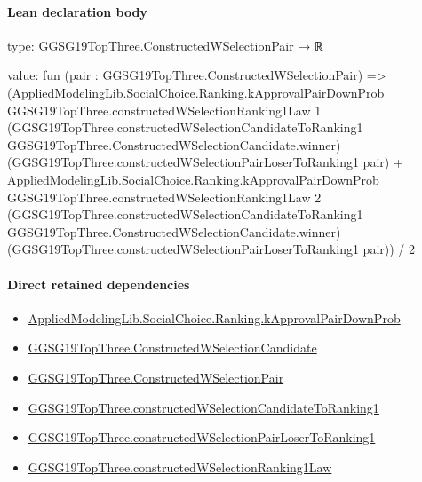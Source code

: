 \documentclass[10pt]{article}
\begin{document}
\paragraph{Lean declaration body}
\begin{ReviewVerbatim}
type:
GGSG19TopThree.ConstructedWSelectionPair → ℝ

value:
fun (pair : GGSG19TopThree.ConstructedWSelectionPair) =>
  (AppliedModelingLib.SocialChoice.Ranking.kApprovalPairDownProb GGSG19TopThree.constructedWSelectionRanking1Law 1
        (GGSG19TopThree.constructedWSelectionCandidateToRanking1 GGSG19TopThree.ConstructedWSelectionCandidate.winner)
        (GGSG19TopThree.constructedWSelectionPairLoserToRanking1 pair) +
      AppliedModelingLib.SocialChoice.Ranking.kApprovalPairDownProb GGSG19TopThree.constructedWSelectionRanking1Law 2
        (GGSG19TopThree.constructedWSelectionCandidateToRanking1 GGSG19TopThree.ConstructedWSelectionCandidate.winner)
        (GGSG19TopThree.constructedWSelectionPairLoserToRanking1 pair)) /
    2
\end{ReviewVerbatim}

\paragraph{Direct retained dependencies}
\begin{itemize}\raggedright
\item \hyperlink{governing-declaration-f0edd92cba673ac3}{Applied\allowbreak{}Modeling\allowbreak{}Lib.\allowbreak{}Social\allowbreak{}Choice.\allowbreak{}Ranking.\allowbreak{}k\allowbreak{}Approval\allowbreak{}Pair\allowbreak{}Down\allowbreak{}Prob}
\item \hyperlink{governing-declaration-3d8d24c3324b5679}{GGSG19\allowbreak{}Top\allowbreak{}Three.\allowbreak{}Constructed\allowbreak{}W\allowbreak{}Selection\allowbreak{}Candidate}
\item \hyperlink{governing-declaration-e199ab04eef2bd8a}{GGSG19\allowbreak{}Top\allowbreak{}Three.\allowbreak{}Constructed\allowbreak{}W\allowbreak{}Selection\allowbreak{}Pair}
\item \hyperlink{governing-declaration-9fcc66be47e20c93}{GGSG19\allowbreak{}Top\allowbreak{}Three.\allowbreak{}constructed\allowbreak{}W\allowbreak{}Selection\allowbreak{}Candidate\allowbreak{}To\allowbreak{}Ranking1}
\item \hyperlink{governing-declaration-016411617e1a74fc}{GGSG19\allowbreak{}Top\allowbreak{}Three.\allowbreak{}constructed\allowbreak{}W\allowbreak{}Selection\allowbreak{}Pair\allowbreak{}Loser\allowbreak{}To\allowbreak{}Ranking1}
\item \hyperlink{governing-declaration-14324bc497c42774}{GGSG19\allowbreak{}Top\allowbreak{}Three.\allowbreak{}constructed\allowbreak{}W\allowbreak{}Selection\allowbreak{}Ranking1\allowbreak{}Law}
\end{itemize}
\hypertarget{governing-declaration-163411438057faa9}{}
\end{document}
